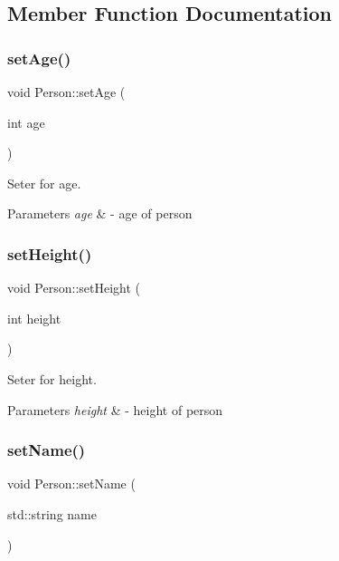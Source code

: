 \subsection{Member Function Documentation}
\mbox{\label{classPerson_ac8ade54c27a0657c987c395ff04a9d46}} 
\subsubsection{\texorpdfstring{set\+Age()}{setAge()}}
{\footnotesize\ttfamily void Person\+::set\+Age (\begin{DoxyParamCaption}\item[{int}]{age }\end{DoxyParamCaption})}



Seter for age. 


\begin{DoxyParams}{Parameters}
{\em age} & -\/ age of person \\
\hline
\end{DoxyParams}
\mbox{\label{classPerson_a93800494846b0955102ce75ff3d1da13}} 
\subsubsection{\texorpdfstring{set\+Height()}{setHeight()}}
{\footnotesize\ttfamily void Person\+::set\+Height (\begin{DoxyParamCaption}\item[{int}]{height }\end{DoxyParamCaption})}



Seter for height. 


\begin{DoxyParams}{Parameters}
{\em height} & -\/ height of person \\
\hline
\end{DoxyParams}
\mbox{\label{classPerson_ad6e438f456d3ae6f5b477931c0a6aeba}} 
\subsubsection{\texorpdfstring{set\+Name()}{setName()}}
{\footnotesize\ttfamily void Person\+::set\+Name (\begin{DoxyParamCaption}\item[{std\+::string}]{name }\end{DoxyParamCaption})}



